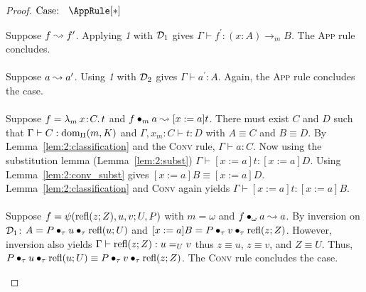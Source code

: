 \begin{proof}
    $\text{Case: }\begin{array}{c} \AppRule[*] \end{array}$
    \begin{proofcase}
        Suppose $f \leadsto f^\prime$.
        Applying \textit{1} with $\mathcal{D}_{1}$ gives $\Gamma \vdash f^\prime : (x : A) \to_m B$.
        The \textsc{App} rule concludes.
        \\ \\
        Suppose $a \leadsto a^\prime$.
        Using \textit{1} with $\mathcal{D}_{2}$ gives $\Gamma \vdash a^\prime : A$.
        Again, the \textsc{App} rule concludes the case.
        \\ \\
        Suppose $f = {\lambda_m}\, x\! : \! C.\, t$ and $f \bullet_{m} a \leadsto [x := a]t$.
        There must exist $C$ and $D$ such that $\Gamma \vdash C : \textnormal{dom}_\Pi(m, K)$ and $\Gamma, x_m : C \vdash t : D$ with $A \equiv C$ and $B \equiv D$.
        By Lemma~\ref{lem:2:classification} and the \textsc{Conv} rule, $\Gamma \vdash a : C$.
        Now using the substitution lemma (Lemma~\ref{lem:2:subst}) $\Gamma \vdash [x := a]t : [x := a]D$.
        Using Lemma~\ref{lem:2:conv_subst} gives $[x := a]B \equiv [x := a]D$.
        Lemma~\ref{lem:2:classification} and \textsc{Conv} again yields $\Gamma \vdash [x := a]t : [x := a]B$.
        \\ \\
        Suppose $f = \psi(\textnormal{refl}(z;Z), u, v; U, P)$ with $m = \omega$ and $f \bullet_{\omega} a \leadsto a$.
        By inversion on $\mathcal{D}_{1}$: $A = P \bullet_{\tau} u \bullet_{\tau} \textnormal{refl}(u;U)$ and $[x := a]B = P \bullet_{\tau} v \bullet_{\tau} \textnormal{refl}(z;Z)$.
        However, inversion also yields $\Gamma \vdash \textnormal{refl}(z;Z) : u =_U v$ thus $z \equiv u$, $z \equiv v$, and $Z \equiv U$.
        Thus, $P \bullet_{\tau} u \bullet_{\tau} \textnormal{refl}(u;U) \equiv P \bullet_{\tau} v \bullet_{\tau} \textnormal{refl}(z;Z)$.
        The \textsc{Conv} rule concludes the case.
    \end{proofcase}


\end{proof}
